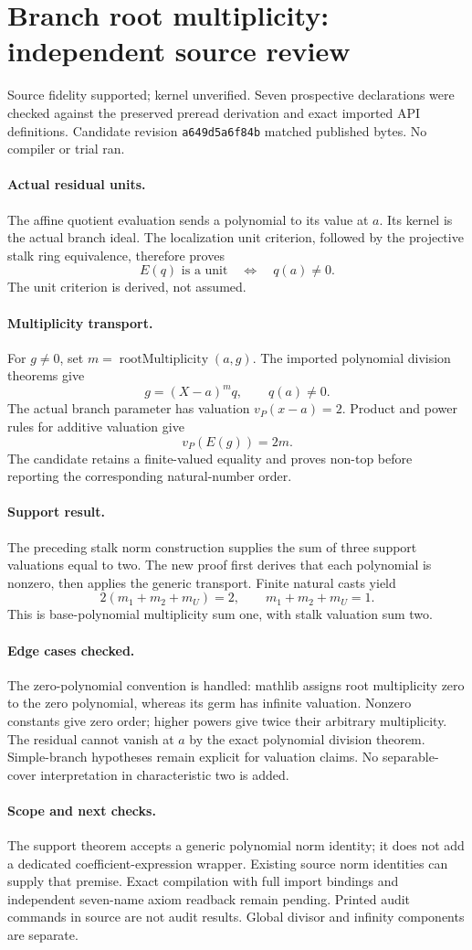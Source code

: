 \documentclass[10pt]{article}
\begin{document}
\section*{Branch root multiplicity: independent source review}
Source fidelity supported; kernel unverified. Seven prospective declarations were checked against the preserved preread derivation and exact imported API definitions. Candidate revision \texttt{a649d5a6f84b} matched published bytes. No compiler or trial ran.
\paragraph{Actual residual units.} The affine quotient evaluation sends a polynomial to its value at $a$. Its kernel is the actual branch ideal. The localization unit criterion, followed by the projective stalk ring equivalence, therefore proves
\[E(q)\text{ is a unit}\quad\Longleftrightarrow\quad q(a)\ne0.\]
The unit criterion is derived, not assumed.
\paragraph{Multiplicity transport.} For $g\ne0$, set $m=\operatorname{rootMultiplicity}(a,g)$. The imported polynomial division theorems give
\[g=(X-a)^m q,\qquad q(a)\ne0.\]
The actual branch parameter has valuation $v_P(x-a)=2$. Product and power rules for additive valuation give
\[v_P(E(g))=2m.\]
The candidate retains a finite-valued equality and proves non-top before reporting the corresponding natural-number order.
\paragraph{Support result.} The preceding stalk norm construction supplies the sum of three support valuations equal to two. The new proof first derives that each polynomial is nonzero, then applies the generic transport. Finite natural casts yield
\[2(m_1+m_2+m_U)=2,\qquad m_1+m_2+m_U=1.\]
This is base-polynomial multiplicity sum one, with stalk valuation sum two.
\paragraph{Edge cases checked.} The zero-polynomial convention is handled: mathlib assigns root multiplicity zero to the zero polynomial, whereas its germ has infinite valuation. Nonzero constants give zero order; higher powers give twice their arbitrary multiplicity. The residual cannot vanish at $a$ by the exact polynomial division theorem. Simple-branch hypotheses remain explicit for valuation claims. No separable-cover interpretation in characteristic two is added.
\paragraph{Scope and next checks.} The support theorem accepts a generic polynomial norm identity; it does not add a dedicated coefficient-expression wrapper. Existing source norm identities can supply that premise. Exact compilation with full import bindings and independent seven-name axiom readback remain pending. Printed audit commands in source are not audit results. Global divisor and infinity components are separate.
\end{document}
